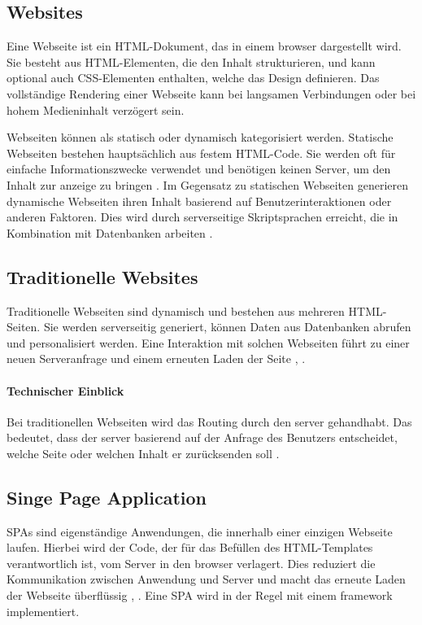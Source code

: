 \subsection{Websites}
Eine Webseite ist ein \ac{HTML}-Dokument, das in einem \gls{browser} dargestellt wird.
Sie besteht aus \ac{HTML}-Elementen, die den Inhalt strukturieren, und kann optional auch \ac{CSS}-Elementen enthalten, welche das Design definieren.
Das vollständige Rendering einer Webseite kann bei langsamen Verbindungen oder bei hohem Medieninhalt verzögert sein.

Webseiten können als statisch oder dynamisch kategorisiert werden.
Statische Webseiten bestehen hauptsächlich aus festem HTML-Code.
Sie werden oft für einfache Informationszwecke verwendet und benötigen keinen Server, um den Inhalt zur anzeige zu bringen \cite{Robbins2018}.
Im Gegensatz zu statischen Webseiten generieren dynamische Webseiten ihren Inhalt basierend auf Benutzerinteraktionen oder anderen Faktoren.
Dies wird durch serverseitige Skriptsprachen erreicht, die in Kombination mit Datenbanken arbeiten \cite{Robbins2018}.

\subsection{Traditionelle Websites}
Traditionelle Webseiten sind dynamisch und bestehen aus mehreren \ac{HTML}-Seiten.
Sie werden serverseitig generiert, können Daten aus Datenbanken abrufen und personalisiert werden.
Eine Interaktion mit solchen Webseiten führt zu einer neuen Serveranfrage und einem erneuten Laden der Seite \cite{Robbins2018}, \cite{Scott2015}.

\paragraph*{Technischer Einblick}
Bei traditionellen Webseiten wird das Routing durch den \gls{server} gehandhabt.
Das bedeutet, dass der \gls{server} basierend auf der Anfrage des Benutzers entscheidet, welche Seite oder welchen Inhalt er zurücksenden soll \cite{Robbins2018}.

\subsection{Singe Page Application}
\ac{SPA}s sind eigenständige Anwendungen, die innerhalb einer einzigen Webseite laufen.
Hierbei wird der Code, der für das Befüllen des \ac{HTML}-Templates verantwortlich ist, vom Server in den \gls{browser} verlagert.
Dies reduziert die Kommunikation zwischen Anwendung und Server und macht das erneute Laden der Webseite überflüssig \cite{Flanagan2011}, \cite{Doguhan2020}.
Eine \ac{SPA} wird in der Regel mit einem \gls{framework} implementiert.

